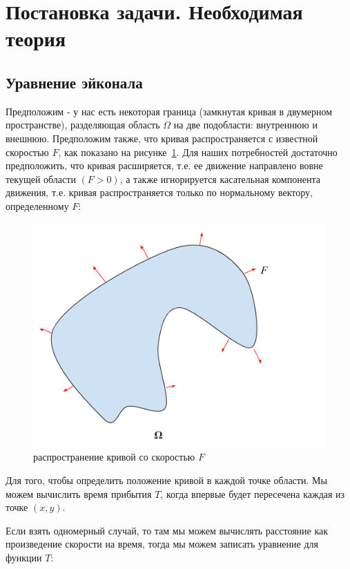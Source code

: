 \section{Постановка задачи. Необходимая теория}
\label{sec:theory}

\subsection {Уравнение эйконала}
\label{sec:csdisttrack}

Предположим - у нас есть некоторая граница (замкнутая кривая в
двумерном пространстве), разделяющая область $\Omega$ на две подобласти:
внутреннюю и внешнюю. Предположим также, что кривая распространяется с
известной скоростью $F$, как показано на рисунке~\ref{fig:eikvis}. Для наших
потребностей достаточно предположить, что кривая расширяется, т.е. ее
движение направлено вовне текущей области $(F>0)$, а также
игнорируется касательная компонента движения, т.е. кривая
распространяется только по нормальному вектору, определенному $F$:

\begin{figure}[h]
  \centering
  \includegraphics[width=0.5\linewidth]{img/eikonal_vision.png}
  \hfil \caption{распространение кривой со скоростью $F$}
  \label{fig:eikvis}

\end{figure}


Для того, чтобы определить положение кривой в каждой точке области. Мы
можем вычислить время прибытия $T$, когда впервые будет пересечена
каждая из точке $(x,y)$.

Если взять одномерный случай, то там мы можем вычислять расстояние как
произведение скорости на время, тогда мы можем записать уравнение для
функции $T$:

